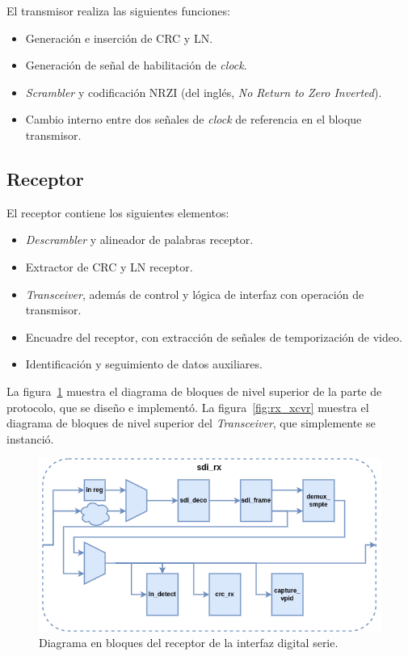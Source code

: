   El transmisor realiza las siguientes funciones:
  \begin{itemize}
      \item Generación e inserción de CRC y LN\@.
      \item Generación de señal de habilitación de \textit{clock}.
      \item \textit{Scrambler} y codificación NRZI (del inglés, \textit{No Return to Zero Inverted}).
      \item Cambio interno entre dos señales de \textit{clock} de referencia en el bloque transmisor.
  \end{itemize}

\subsection{Receptor}

  El receptor contiene los siguientes elementos:
  \begin{itemize}
      \item \textit{Descrambler} y alineador de palabras receptor.
      \item Extractor de CRC y LN receptor.
      \item \textit{Transceiver}, además de control y lógica de interfaz con operación de transmisor.
      \item Encuadre del receptor, con extracción de señales de temporización de video.
      \item Identificación y seguimiento de datos auxiliares.
  \end{itemize}

  La figura~\ref{fig:sdi_rx} muestra el diagrama de bloques de nivel superior de
  la parte de protocolo, que se diseño e implementó. La figura~\ref{fig:rx_xcvr}
  muestra el diagrama de bloques de nivel superior del \textit{Transceiver}, que
  simplemente se instanció.

  \begin{figure}[htbp]
      \centering
      \includegraphics[width=\linewidth]{./Figures/sdi_rx.png}
      \caption{Diagrama en bloques del receptor de la interfaz digital serie.}\label{fig:sdi_rx}
  \end{figure}

